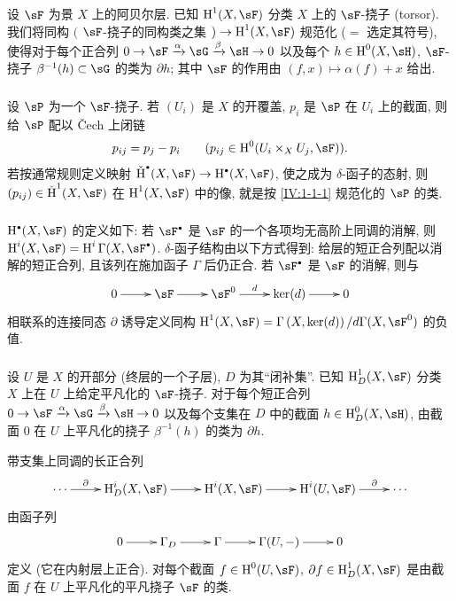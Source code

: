 设 $\sF$ 为景 $X$ 上的阿贝尔层. 已知 $\h^1(X,\sF)$ 分类 $X$ 上的 $\sF$-挠子 (torsor).
我们将同构 $($ $\sF$-挠子的同构类之集 $)\to \h^1(X,\sF)$ 规范化 ($=$ 选定其符号),
使得对于每个正合列 $0\to \sF\xrightarrow\alpha\sG\xrightarrow\beta\sH\to 0$
以及每个 $h\in\h^0(X,\sH)$, $\sF$-挠子 $\beta^{-1}(h)\subset \sG$ 的类为 $\partial h$;
其中 $\sF$ 的作用由 $(f,x)\mapsto \alpha(f)+x$ 给出.

\subsubsection{}\label{IV:1-1-2}

设 $\sP$ 为一个 $\sF$-挠子. 若 $(U_i)$ 是 $X$ 的开覆盖, $p_i$ 是 $\sP$ 在 $U_i$ 上的截面,
则给 $\sP$ 配以 \v{C}ech 上闭链
\[
  p_{i j} = p_j - p_i \qquad \text{($p_{i j}\in \h^0(U_i\times_X U_j,\sF)$).}
\]
若按通常规则定义映射
$\operatorname{\check H}^\bullet(X,\sF)\to \h^\bullet(X,\sF)$,
使之成为 $\delta$-函子的态射, 则
$(p_{i j})\in \operatorname{\check H}^1(X,\sF)$ 在 $\h^1(X,\sF)$ 中的像,
就是按 \ref{IV:1-1-1} 规范化的 $\sP$ 的类.

\subsubsection{}\label{IV:1-1-3}

$\h^\bullet(X,\sF)$ 的定义如下: 若 $\sF^\bullet$ 是 $\sF$ 的一个各项均无高阶上同调的消解,
则 $\h^i(X,\sF) = \h^i\Gamma(X,\sF^\bullet)$.
$\delta$-函子结构由以下方式得到: 给层的短正合列配以消解的短正合列,
且该列在施加函子 $\Gamma$ 后仍正合. 若 $\sF^\bullet$ 是 $\sF$ 的消解,
则与
\[\xymatrix{
  0 \ar[r]
    & \sF \ar[r]
    & \sF^0 \ar[r]^-d
    & \ker(d) \ar[r]
    & 0
}\]
相联系的连接同态 $\partial$ 诱导定义同构
$\h^1(X,\sF) = \Gamma\left(X,\ker(d)\right)/d \Gamma(X,\sF^0)$ 的负值.

\subsubsection{}\label{IV:1-1-4}

设 $U$ 是 $X$ 的开部分 (终层的一个子层), $D$ 为其“闭补集”.
已知 $\h_D^1(X,\sF)$ 分类 $X$ 上在 $U$ 上给定平凡化的 $\sF$-挠子.
对于每个短正合列 $0\to \sF\xrightarrow\alpha \sG\xrightarrow\beta\sH\to 0$
以及每个支集在 $D$ 中的截面 $h\in\h_D^0(X,\sH)$,
由截面 $0$ 在 $U$ 上平凡化的挠子 $\beta^{-1}(h)$ 的类为 $\partial h$.

带支集上同调的长正合列
\[\xymatrix{
  \cdots \ar[r]^-\partial
    & \h_D^i(X,\sF) \ar[r]
    & \h^i(X,\sF) \ar[r]
    & \h^i(U,\sF) \ar[r]^-\partial
    & \cdots
}\]
由函子列
\[\xymatrix{
  0 \ar[r]
    & \Gamma_D \ar[r]
    & \Gamma \ar[r]
    & \Gamma(U,-) \ar[r]
    & 0
}\]
定义 (它在内射层上正合). 对每个截面 $f\in \h^0(U,\sF)$,
$\partial f\in \h_D^1(X,\sF)$ 是由截面 $f$ 在 $U$ 上平凡化的平凡挠子 $\sF$ 的类.

